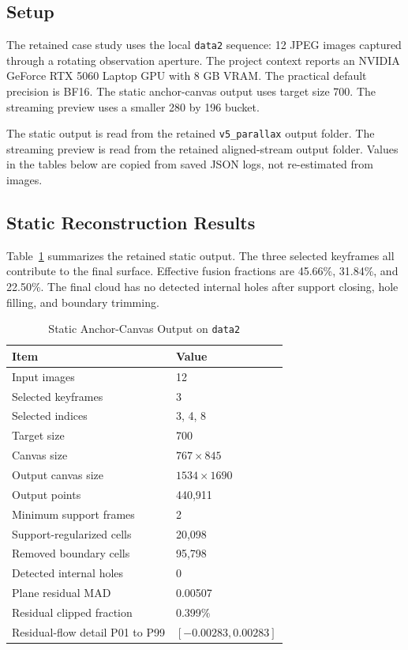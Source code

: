 \documentclass[conference]{IEEEtran}
\begin{document}
\subsection{Setup}
The retained case study uses the local \texttt{data2} sequence: 12 JPEG images captured through a rotating observation aperture. The project context reports an NVIDIA GeForce RTX 5060 Laptop GPU with 8 GB VRAM. The practical default precision is BF16. The static anchor-canvas output uses target size 700. The streaming preview uses a smaller 280 by 196 bucket.

The static output is read from the retained \texttt{v5\_parallax} output folder. The streaming preview is read from the retained aligned-stream output folder. Values in the tables below are copied from saved JSON logs, not re-estimated from images.

\subsection{Static Reconstruction Results}
Table~\ref{tab:static} summarizes the retained static output. The three selected keyframes all contribute to the final surface. Effective fusion fractions are 45.66\%, 31.84\%, and 22.50\%. The final cloud has no detected internal holes after support closing, hole filling, and boundary trimming.

\begin{table}[t]
\centering
\caption{Static Anchor-Canvas Output on \texttt{data2}}
\label{tab:static}
\begin{tabular}{ll}
\toprule
Item & Value \\
\midrule
Input images & 12 \\
Selected keyframes & 3 \\
Selected indices & 3, 4, 8 \\
Target size & 700 \\
Canvas size & $767 \times 845$ \\
Output canvas size & $1534 \times 1690$ \\
Output points & 440,911 \\
Minimum support frames & 2 \\
Support-regularized cells & 20,098 \\
Removed boundary cells & 95,798 \\
Detected internal holes & 0 \\
Plane residual MAD & 0.00507 \\
Residual clipped fraction & 0.399\% \\
Residual-flow detail P01 to P99 & $[-0.00283, 0.00283]$ \\
\bottomrule
\end{tabular}
\end{table}
\end{document}
